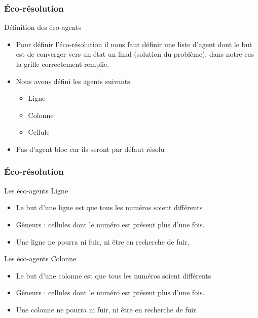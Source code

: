 \begin{frame}
    \frametitle{Éco-résolution}
    \begin{block}{Définition des éco-agents}
    		\begin{itemize}
    		
    		\item Pour définir l'éco-résolution il nous faut définir une liste d'agent dont le but est de converger vers un état un final (solution du problème), dans notre cas la grille correctement remplie.\\
    		\item Nous avons défini les agents suivants:
    		\begin{itemize}
    			\item Ligne
    			\item Colonne
    			\item Cellule
    		\end{itemize}
    		\item Pas d'agent bloc car ils seront par défaut résolu
    		\end{itemize}

    \end{block}
\end{frame}

\begin{frame}
    \frametitle{Éco-résolution}
    \begin{block}{Les éco-agents Ligne}
    		\begin{itemize}
    			\item Le but d'une ligne est que tous les numéros soient différents
    			\item Gêneurs : cellules dont le numéro est présent plus d'une fois.
    			\item Une ligne ne pourra ni fuir, ni être en recherche de fuir. 
    		\end{itemize}
    \end{block}
    \pause
     \begin{block}{Les éco-agents Colonne}
    		\begin{itemize}
    			\item Le but d'une colonne est que tous les numéros soient différents
    			\item Gêneurs : cellules dont le numéro est présent plus d'une fois.
    			\item Une colonne ne pourra ni fuir, ni être en recherche de fuir. 
    		\end{itemize}
    \end{block}
\end{frame}


